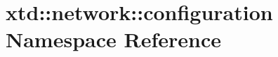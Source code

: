 \hypertarget{namespacextd_1_1network_1_1configuration}{\section{xtd\-:\-:network\-:\-:configuration Namespace Reference}
\label{namespacextd_1_1network_1_1configuration}
}
